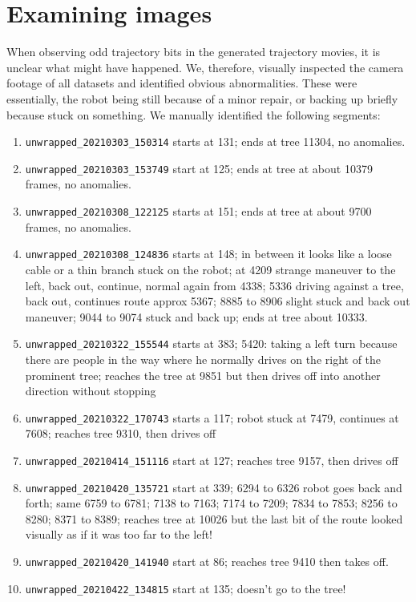 \documentclass[a4]{article}
\begin{document}
\section{Examining images}
When observing odd trajectory bits in the generated trajectory movies,
it is unclear what might have happened. We, therefore, visually
inspected the camera footage of all datasets and identified obvious
abnormalities. These were essentially, the robot being still because
of a minor repair, or backing up briefly because stuck on
something. We manually identified the following segments: 
\begin{enumerate}
  \item
\verb+unwrapped_20210303_150314+ starts at 131; ends at tree 11304, no anomalies.
  \item
\verb+unwrapped_20210303_153749+ start at 125; ends at tree at about 10379 frames,
no anomalies.
  \item
\verb+unwrapped_20210308_122125+ starts at 151; ends at tree at about 9700 frames, no anomalies.
  \item
\verb+unwrapped_20210308_124836+ starts at 148; in between it looks like a loose cable or a thin
branch stuck on the robot; at 4209 strange maneuver to the left, back
out, continue, normal again from 4338; 5336 driving against a tree,
back out, continues route approx 5367; 8885 to 8906 slight stuck and
back out maneuver; 9044 to 9074 stuck and back up; ends at tree about
10333.
  \item
\verb+unwrapped_20210322_155544+ starts at 383; 5420: taking a left turn because
there are people in the way where he normally drives on the right of the
prominent tree; reaches the tree at 9851 but then drives off into
another direction without stopping
  \item
\verb+unwrapped_20210322_170743+ starts a 117; robot stuck at 7479, continues at
7608; reaches tree 9310, then drives off
  \item
\verb+unwrapped_20210414_151116+ start at 127; reaches tree 9157, then
drives off
  \item
\verb+unwrapped_20210420_135721+ start at 339; 6294 to 6326 robot goes
back and forth; same 6759 to 6781; 7138 to 7163; 7174 to 7209; 7834 to
7853; 8256 to 8280; 8371 to 8389; reaches tree at 10026 but the last
bit of the route looked visually as if it was too far to the left!
  \item
\verb+unwrapped_20210420_141940+ start at 86; reaches tree 9410 then
takes off.
  \item
\verb+unwrapped_20210422_134815+ start at 135; doesn't go to the tree!

\end{enumerate}
\end{document}
